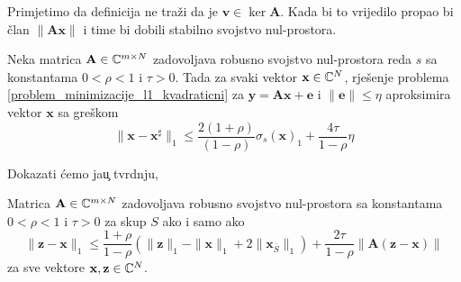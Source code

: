 \documentclass[a4paper,twoside,12pt]{memoir} %
\newcommand{\vect}[1]{\mathbf{#1}}
\renewcommand{\vec}{\vect}
\newcommand{\norm}[1]{\|{#1}\|}
\begin{document}
\noindent
Primjetimo da definicija ne tra\v{z}i da je $\vec v \in \ker \vec A$. Kada bi to vrijedilo propao bi \v{c}lan $\norm{\vec{Ax}}$ i time bi dobili stabilno svojstvo nul-prostora. 
\begin{thm}
    Neka matrica $\vec A \in \C^{m \times N}$ zadovoljava robusno svojstvo nul-prostora reda $s$ sa konstantama $0<\rho<1$ i $\tau > 0$. Tada za svaki vektor $\vec x \in \C^N$, rje\v{s}enje problema \eqref{problem_minimizacije_l1_kvadraticni} za $\vec y = \vec{Ax}+\vec{e}$ i $\norm{\vec e} \leq \eta$ aproksimira vektor $\vec x$ sa gre\v{s}kom
    \begin{equation*}
        \norm{\vec x - \vec x^{\sharp}}_1 \leq \frac{2(1+\rho)}{(1-\rho)} \sigma_s(\vec x)_1 + \frac{4 \tau}{1-\rho}\eta 
    \end{equation*}
\end{thm}
Dokazati \'cemo ja\c{u} tvrdnju,
\begin{thm}\label{tm:4:20}
    Matrica $\vec A \in \C^{m \times N}$ zadovoljava robusno svojstvo nul-prostora sa konstantama $0<\rho<1$ i $\tau > 0$ za skup $S$ ako i samo ako
    \begin{equation}\label{robusno_tm2_nejed}
        \norm{\vec z - \vec x}_1 \leq \frac{1+\rho}{1-\rho} (\norm{\vec z}_1 - \norm{\vec x}_1 + 2 \norm{\vec x_{\bar S}}_1) + \frac{2 \tau}{1 - \rho} \norm{\vec A (\vec z - \vec x)}  
    \end{equation}
    za sve vektore $\vec x, \vec z \in \C^N$.
\end{thm}
\end{document}
